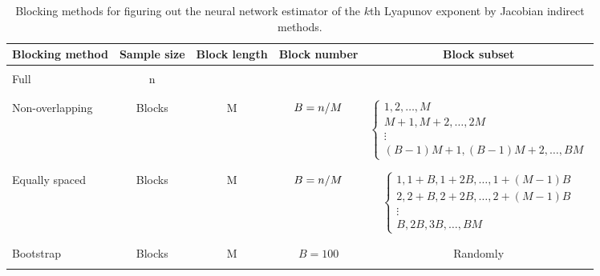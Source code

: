 \begin{table}[h!]
\centering
\begin{adjustbox}{max width=\textwidth}
\begin{tabular}{lcccc}
\hline   
Blocking method & Sample size & Block length & Block number                                                               & Block subset \\ \hline
\\[.0007cm]
Full            & n           &              &                                                                            &  \\[.0007cm] \\ \hline
\\[.0007cm]
Non-overlapping & Blocks      & M            & $B={n \mathord{\left/{\vphantom {T M}} \right.\kern-\nulldelimiterspace} M}$ & \quad $\left\{ {\begin{array}{*{20}{l}}
 {1,2, \ldots ,M} \\ 
 {M + 1,M + 2, \ldots ,2M} \\ 
 \vdots  \\ 
 {\left( {B - 1} \right)M + 1,\left( {B - 1} \right)M + 2, \ldots ,BM} 
\end{array}} \right.$ \\[.0007cm] \\ \hline
\\[.0007cm]
Equally spaced  & Blocks      & M            & $B={n \mathord{\left/{\vphantom {T M}} \right.\kern-\nulldelimiterspace} M}$ & $\left\{ {\begin{array}{*{20}{l}}
  {1,1 + B,1 + 2B, \ldots ,1 + \left( {M - 1} \right)B} \\ 
  {2,2 + B,2 + 2B, \ldots ,2 + \left( {M - 1} \right)B} \\ 
   \vdots  \\ 
  {B,2B,3B, \ldots ,BM} 
\end{array}} \right.$ \\[.0007cm] \\ \hline
\\[.0007cm]
Bootstrap       & Blocks      & M            & $B=100$                                                                    & Randomly \\[.0007cm] \\ \hline 
\end{tabular}
\end{adjustbox}
\caption{\label{tab:2} Blocking methods for figuring out the neural network estimator of the $k$th Lyapunov exponent by Jacobian indirect methods.}
\end{table}

